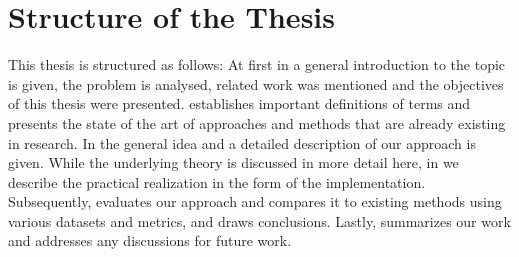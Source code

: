 \section{Structure of the Thesis}
\label{sec:structure_of_thesis}

This thesis is structured as follows:
At first in \textbf{} a general introduction to the topic is given, the problem is analysed, related work was mentioned and the objectives of this thesis were presented.
\textbf{} establishes important definitions of terms and presents the state of the art of approaches and methods that are already existing in research.
In \textbf{} the general idea and a detailed description of our approach is given.
While the underlying theory is discussed in more detail here, in \textbf{} we describe the practical realization in the form of the implementation.
Subsequently, \textbf{} evaluates our approach and compares it to existing methods using various datasets and metrics, and draws conclusions.
Lastly, \textbf{} summarizes our work and addresses any discussions for future work.